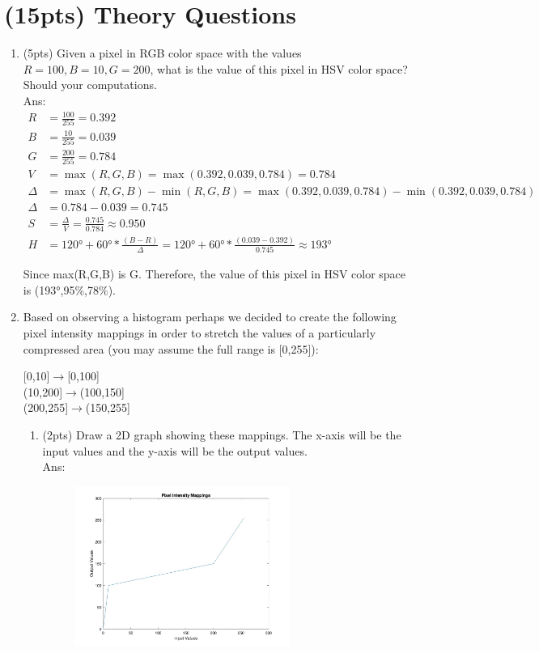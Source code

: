 \documentclass[12pt]{article}
\begin{document}
\newpage
\section{(15pts) Theory Questions}
\begin{enumerate}
\item (5pts) Given a pixel in RGB color space with the values $R=100, B=10, G=200$, what is the value of this pixel in HSV color space?  Should your computations.\\
Ans: \begin{align*}
R &= \frac{100}{255} = 0.392 \\
B &= \frac{10}{255} = 0.039 \\
G &= \frac{200}{255} = 0.784 \\
V &= \max(R,G,B) = \max(0.392,0.039,0.784) = 0.784 \\
\Delta &= \max(R,G,B) - \min(R,G,B) = \max(0.392,0.039,0.784) - \min(0.392,0.039,0.784) \\
\Delta &= 0.784 - 0.039 = 0.745 \\
S &= \frac{\Delta}{V} = \frac{0.745}{0.784} \approx 0.950 \\
H &= 120° + 60° * \frac{(B - R)}{\Delta} = 120° + 60° * \frac{(0.039 - 0.392)}{0.745} \approx 193°
\end{align*}

Since max(R,G,B) is G. Therefore, the value of this pixel in HSV color space is (193°,95\%,78\%).\\

\item 	Based on observing a histogram perhaps we decided to create the following pixel intensity mappings in order to stretch the values of a particularly compressed area (you may assume the full range is [0,255]):\\

\begin{center}
[0,10]$\rightarrow$[0,100]\\
(10,200]$\rightarrow$(100,150]\\
(200,255]$\rightarrow$(150,255]
\end{center}

\begin{enumerate}
\item(2pts) Draw a 2D graph showing these mappings.  The x-axis will be the input values and the y-axis will be the output values.\\
Ans: \\
\begin{figure}[htp]
    \centering
    \includegraphics[width=7cm]{mappings.jpg}
\end{figure}


\end{enumerate}
\end{enumerate}
\end{document}
